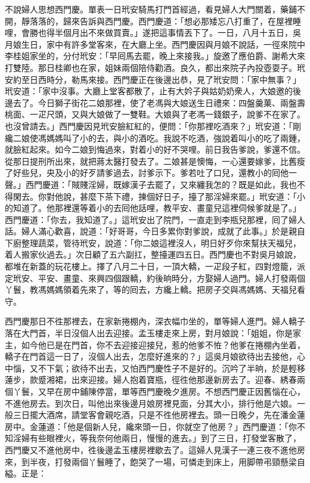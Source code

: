 不說婦人思想西門慶。單表一日玳安騎馬打門首經過，看見婦人大門關着，藥鋪不開，靜落落的，歸來告訴與西門慶。西門慶道：「想必那矮忘八打重了，在屋裡睡哩，會勝也得半個月出不來做買賣。」遂把這事情丟下了。一日，八月十五日，吳月娘生日，家中有許多堂客來，在大廳上坐。西門慶因與月娘不說話，一徑來院中李桂姐家坐的，分付玳安：「早囘馬去罷，晚上來接我。」旋邀了應伯爵、謝希大來打雙陸。那日桂卿也在家，姐妹兩個陪侍勸酒。良久，都出來院子內投壺耍子。玳安約至日西時分，勒馬來接。西門慶正在後邊出恭，見了玳安問：「家中無事？」玳安道：「家中沒事。大廳上堂客都散了，止有大妗子與姑奶奶衆人，大娘邀的後邊去了。今日獅子街花二娘那裡，使了老馮與大娘送生日禮來：{}四盤羹菓、兩盤壽桃面、一疋尺頭，又與大娘做了一雙鞋。大娘與了老馮一錢銀子，說爹不在家了。也沒曾請去。」{}西門慶因見玳安臉紅紅的，便問：「你那裡吃酒來？」玳安道：「剛纔二娘使馮媽媽叫了小的去，與小的酒吃。我說不吃酒，強說着叫小的吃了兩鍾，就臉紅起來。{}如今二娘到悔過來，對着小的好不哭哩。前日我告爹說，爹還不信。從那日提刑所出來，就把蔣太醫打發去了。二娘甚是懊悔，一心還要嫁爹，比舊瘦了好些兒，央及小的好歹請爹過去，討爹示下。爹若吐了口兒，還教小的囘他一聲。」西門慶道：「賊賤淫婦，既嫁漢子去罷了，又來纏我怎的？既是如此，我也不得閑去。你對他說，甚麼下茶下禮，揀個好日子，擡了那淫婦來罷。」{}玳安道：「小的知道了。他那裡還等着小的去囘他話哩，教平安、畫童兒這裡伺候爹就是了。」西門慶道：「你去，我知道了。」這玳安出了院門，一直走到李瓶兒那裡，囘了婦人話。婦人滿心歡喜，說道：「好哥哥，今日多累你對爹說，成就了此事。」於是親自下廚整理蔬菜，管待玳安，說道：「你二娘這裡沒人，明日好歹你來幫扶天福兒，着人搬家伙過去。」次日顧了五六副扛，整擡運四五日。西門慶也不對吳月娘說，都堆在新蓋的玩花樓上。擇了八月二十日，一頂大轎，一疋段子紅，四對燈籠，派定玳安、平安、畫童、來興四個跟轎，約後晌時分，方娶婦人過門。婦人打發兩個丫鬟，教馮媽媽領着先來了，等的囘去，方纔上轎。把房子交與馮媽媽、天福兒看守。

西門慶那日不徃那裡去，在家新捲棚內，深衣幅巾坐的，單等婦人進門。婦人轎子落在大門首，半日沒個人出去迎接。{}孟玉樓走來上房，對月娘說：「姐姐，你是家主，如今他已是在門首，你不去迎接迎接兒，惹的他爹不恠？他爹在捲棚內坐着，轎子在門首這一日了，沒個人出去，怎麼好進來的？」這吳月娘欲待出去接他，心中惱，又不下氣；欲待不出去，又怕西門慶性子不是好的。沉吟了半晌，於是輕移蓮步，款蹙湘裙，出來迎接。婦人抱着寶瓶，徑徃他那邊新房去了。迎春、綉春兩個丫鬟，又早在房中鋪陳停當，單等西門慶晚夕進房。不想西門慶正因舊惱在心，不進他房去。到次日，叫他出來後邊月娘房裡見面，分其大小，排行他是六娘。一般三日擺大酒席，請堂客會親吃酒，只是不徃他房裡去。頭一日晚夕，先在潘金蓮房中。金蓮道：「他是個新人兒，{}纔來頭一日，你就空了他房？」西門慶道：「你不知淫婦有些眼裡火，等我奈何他兩日，慢慢的進去。」到了三日，打發堂客散了，西門慶又不進他房中，徃後邊孟玉樓房裡歇去了。這婦人見漢子一連三夜不進他房來，到半夜，打發兩個丫鬟睡了，飽哭了一場，可憐走到床上，用脚帶弔頸懸梁自縊。{}正是：

